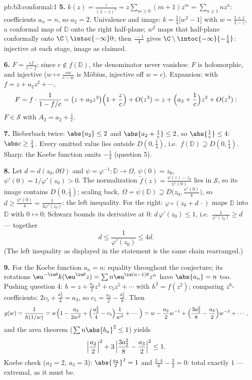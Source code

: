 \begin{solution}{pb:b3:conformal:1}
\textbf{5.} $k(z) = \frac z{(1-z)^2} = z\sum_{m\geq0}(m +
1)z^m = \sum_{n\geq1}nz^n$: coefficients $a_n = n$, so $a_2 =
2$. Univalence and image: $k = \frac14\bigl[w^2 - 1\bigr]$
with $w = \frac{1 + z}{1 - z}$, a conformal map of $\mathbb D$
onto the right half-plane; $w^2$ maps that half-plane
conformally onto $\C\setminus\intoc{-\infty}0$; then
$\frac{\cdot - 1}4$ gives
$\C\setminus\intoc{-\infty}{-\frac14}$: injective at each
stage, image as claimed.

\textbf{6.} $F = \frac{cf}{c - f}$: since $c \notin f(\mathbb
D)$, the denominator never vanishes: $F$ is holomorphic, and
injective ($w \mapsto \frac{cw}{c - w}$ is M\"obius, injective
off $w = c$). Expansion: with $f = z + a_2z^2 + \cdots$,
\[
F = f\cdot\frac1{1 - f/c} = \bigl(z + a_2z^2\bigr)\Bigl(1 +
\frac zc\Bigr) + O(z^3)
= z + \Bigl(a_2 + \frac1c\Bigr)z^2 + O(z^3):
\]
$F \in \mathcal S$ with $A_2 = a_2 + \frac1c$.

\textbf{7.} Bieberbach twice: $\abs{a_2} \leq 2$ and
$\abs{a_2 + \frac1c} \leq 2$, so $\abs{\frac1c} \leq 4$:
$\abs c \geq \frac14$. Every omitted value lies outside
$D(0,\frac14)$, i.e.\ $f(\mathbb D) \supseteq D(0, \frac14)$.
Sharp: the Koebe function omits $-\frac14$ (question 5).

\textbf{8.} Let $d = d(z_0, \partial\Omega)$ and $\psi =
\varphi^{-1} \colon \mathbb D \to \Omega$, $\psi(0) = z_0$,
$\psi'(0) = 1/\varphi'(z_0) > 0$. The normalization $\tilde
f(z) = \frac{\psi(z) - z_0}{\psi'(0)}$ lies in $\mathcal S$,
so its image contains $D(0, \frac14)$; scaling back,
$\Omega = \psi(\mathbb D) \supseteq D\bigl(z_0,
\tfrac{\psi'(0)}4\bigr)$, so $d \geq \frac{\psi'(0)}4 =
\frac1{4\varphi'(z_0)}$: the left inequality. For the right: $\varphi\circ(z_0 + d\,\cdot)$
maps $\mathbb D$ into $\mathbb D$ with $0 \mapsto 0$; Schwarz
bounds its derivative at $0$: $d\,\varphi'(z_0) \leq 1$, i.e.\
$\frac1{\varphi'(z_0)} \geq d$ --- together
\[
d \leq \frac1{\varphi'(z_0)} \leq 4d .
\]
(The left inequality as displayed in the statement is the
same chain rearranged.)

\textbf{9.} For the Koebe function $a_n = n$: equality
throughout the conjecture; its rotations
$\eu^{-\iu\theta}k(\eu^{\iu\theta}z) = \sum
n\eu^{\iu(n-1)\theta}z^n$ have $\abs{a_n} = n$ too. Pushing
question 4: $h = z + \frac{a_2}2z^3 + c_5z^5 + \cdots$ with
$h^2 = f(z^2)$; comparing $z^6$-coefficients: $2c_5 +
\frac{a_2^2}4 = a_3$, so $c_5 = \frac{a_3}2 -
\frac{a_2^2}8$. Then
\[
g(w) = \frac1{h(1/w)} = w\Bigl(1 - \frac{a_2}{2w^2} +
\Bigl(\frac{a_2^2}4 - c_5\Bigr)\frac1{w^4} + \cdots\Bigr)
= w - \frac{a_2}2w^{-1} + \Bigl(\frac{3a_2^2}8 -
\frac{a_3}2\Bigr)w^{-3} + \cdots,
\]
and the area theorem ($\sum n\abs{b_n}^2 \leq 1$) yields
\[
\Bigl|\frac{a_2}2\Bigr|^2 + 3\,\Bigl|\frac{3a_2^2}8 -
\frac{a_3}2\Bigr|^2 \leq 1 .
\]
Koebe check ($a_2 = 2$, $a_3 = 3$): $\abs{\frac{a_2}2}^2 = 1$
and $\frac{3\cdot4}8 - \frac32 = 0$: total exactly $1$ ---
extremal, as it must be.


\end{solution}
